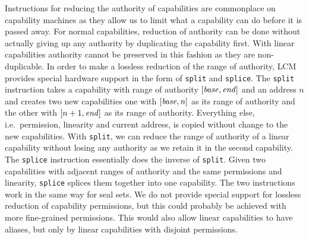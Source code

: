 \documentclass[acmsmall,review,showframe]{acmart}\settopmatter{printfolios=true,printccs=false,printacmref=false}
\newcommand{\trgcm}{\textsc{LCM}}
\begin{document}
Instructions for reducing the authority of capabilities are commonplace on capability machines as they allow us to limit what a capability can do before it is passed away.
For normal capabilities, reduction of authority can be done without actually giving up any authority by duplicating the capability first.
With linear capabilities authority cannot be preserved in this fashion as they are non-duplicable.
In order to make a lossless reduction of the range of authority, \trgcm{} provides special hardware support in the form of \texttt{split} and \texttt{splice}.
The \texttt{split} instruction takes a capability with range of authority $[\mathit{base},\mathit{end}]$ and an address $n$ and creates two new capabilities one with $[\mathit{base},n]$ as its range of authority and the other with $[n+1,\mathit{end}]$ as its range of authority.
Everything else, i.e.\ permission, linearity and current address, is copied without change to the new capabilities.
With \texttt{split}, we can reduce the range of authority of a linear capability without losing any authority as we retain it in the second capability.
The \texttt{splice} instruction essentially does the inverse of \texttt{split}.
Given two capabilities with adjacent ranges of authority and the same permissions and linearity, \texttt{splice} splices them together into one capability.
The two instructions work in the same way for seal sets.
We do not provide special support for lossless reduction of capability permissions, but this could probably be achieved with more fine-grained permissions.
This would also allow linear capabilities to have aliases, but only by linear capabilities with disjoint permissions.
\end{document}
